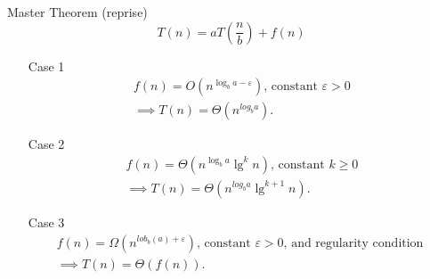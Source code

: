 \documentclass{beamer}
\begin{document}
\begin{frame}{Master Theorem (reprise)}
    \small
    $$
        T(n) = aT\left(\frac{n}{b}\right) + f(n)
    $$ \pause
    \begin{itemize}
        \vspace{-5mm}
        \item[Case 1]
            \begin{align*}
                f(n) = O\left(n^{\log_b a - \varepsilon} \right) \text{, constant }\varepsilon > 0 \\ \implies T(n) = \Theta(n^{log_b a}) \text{.}
            \end{align*} \pause
        \vspace{-5mm}
        \item[Case 2]
            \begin{align*}
                f(n) = \Theta\left(n^{\log_b a}\lg^k n \right) \text{, constant }k \geq 0 \\ \implies T(n) = \Theta(n^{log_b a}\lg^{k + 1} n) \text{.}
            \end{align*} \pause
        \vspace{-5mm}
        \item[Case 3]
            \begin{align*}
                f(n) = \Omega\left(n^{lob_b(a) + \varepsilon} \right) \text{, constant }\varepsilon > 0 \text{, and regularity condition } \\ \implies T(n) = \Theta(f(n)) \text{.}
            \end{align*} \pause
    \end{itemize}
\end{frame}
\end{document}
